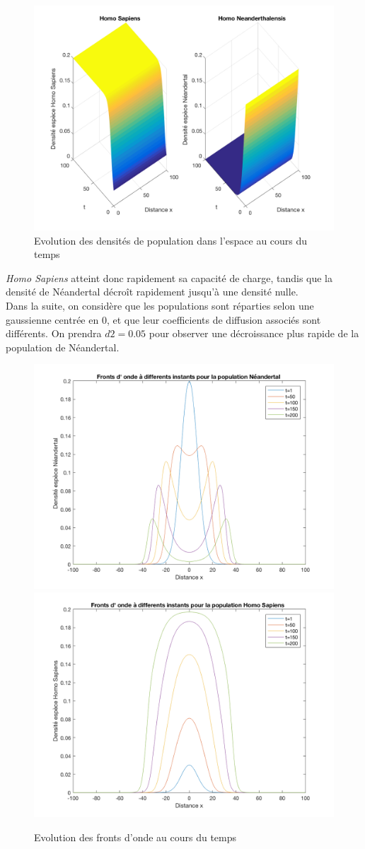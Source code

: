 \documentclass[a4paper,11pt]{article}
\begin{document}
\begin{figure}[H]
\centering
\includegraphics[scale=0.3]{Comp/lvfig1.png}
\caption{Evolution des densités de population dans l'espace au cours du temps}
\label{diffcomp}
\end{figure}

\textit{Homo Sapiens} atteint donc rapidement sa capacité de charge, tandis que la densité de Néandertal décroît rapidement jusqu'à une densité nulle.\\

Dans la suite, on considère que les populations sont réparties selon une gaussienne centrée en 0, et que leur coefficients de diffusion associés sont différents. On prendra $d2 = 0.05$ pour observer une décroissance plus rapide de la population de Néandertal.

\begin{figure}[H]
\centering
\includegraphics[width=0.45\linewidth]{Comp/neand.png}
\includegraphics[width=0.45\linewidth]{Comp/homo.png}
\caption{Evolution des fronts d'onde au cours du temps}
\end{figure}
\end{document}
